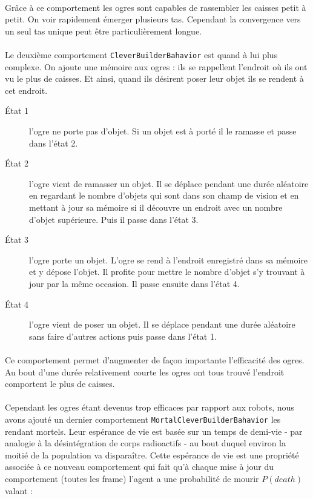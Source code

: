\paragraph{}Grâce à ce comportement les ogres sont capables de rassembler les caisses
petit à petit. On voir rapidement émerger plusieurs tas. Cependant la
convergence vers un seul tas unique peut être particulièrement longue.

\paragraph{}Le deuxième comportement \texttt{CleverBuilderBahavior} est quand à lui plus
complexe. On ajoute une mémoire aux ogres : ils se rappellent l'endroit où ils ont vu le
plus de caisses. Et ainsi, quand ils désirent poser leur objet ils se rendent à
cet endroit.

\begin{description}
    \item[\'Etat 1] l'ogre ne porte pas d'objet. Si un objet est à porté il
        le ramasse et passe dans l'état 2.
    \item[\'Etat 2] l'ogre vient de ramasser un objet. Il se déplace pendant une
        durée aléatoire en regardant le nombre d'objets qui sont dans son
        champ de vision et en mettant à jour sa mémoire si il découvre un
        endroit avec un nombre d'objet supérieure. Puis il passe dans l'état 3.
    \item[\'Etat 3] l'ogre porte un objet. L'ogre se rend à l'endroit
        enregistré dans sa mémoire et y dépose l'objet. Il profite pour mettre
        le nombre d'objet s'y trouvant à jour par la même occasion. Il passe
        ensuite dans l'état 4.
    \item[\'Etat 4] l'ogre vient de poser un objet. Il se déplace pendant une
        durée aléatoire sans faire d'autres actions puis passe dans l'état 1.
\end{description}

\paragraph{}Ce comportement permet d'augmenter de façon importante l'efficacité
des ogres. Au bout d'une durée relativement courte les ogres ont tous trouvé
l'endroit comportent le plus de caisses.

\paragraph{}
Cependant les ogres étant devenus trop efficaces par rapport aux robots, nous
avons ajouté un dernier comportement \texttt{MortalCleverBuilderBahavior} les
rendant mortels. Leur espérance de vie est basée sur un temps de demi-vie -
par analogie à la désintégration de corps radioactifs - au bout duquel environ
la moitié de la population va disparaître. Cette espérance de vie est une
propriété associée à ce nouveau comportement qui fait qu'à chaque mise à jour
du comportement (toutes les frame) l'agent a une probabilité de mourir
$P(death)$ valant :

